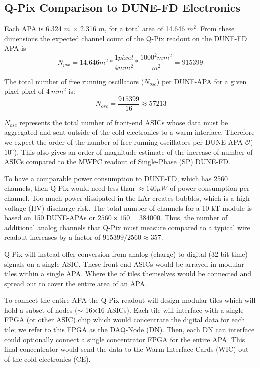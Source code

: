 \subsection{Q-Pix Comparison to DUNE-FD Electronics}
Each APA is 6.324 $\unit{m}$ $\times$ 2.316 $\unit{m}$, for a total area of 14.646 $\unit{m^{2}}$.
From these dimensions the expected channel count of the Q-Pix readout on the DUNE-FD APA is
\begin{equation}
  N_{pix} = 14.646 m^{2} * \frac{1 pixel}{4 mm^{2}} * \frac{ 1000^{2} mm^{2} }{m^{2}} = 915399
\end{equation}

The total number of free running oscillators ($N_{osc}$) per DUNE-APA for a given pixel pixel of $4~mm^{2}$ is:
\begin{equation}~\label{eq:nosc}
N_{osc} = \frac{915399}{16} \approx 57213
\end{equation}

$N_{osc}$ represents the total number of front-end ASICs whose data must be aggregated and sent outside of the cold electronics to a warm interface.
Therefore we expect the order of the number of free running oscillators per DUNE-APA $\mathcal{O}$($10^5$).
This also gives an order of magnitude estimate of the increase of number of ASICs compared to the MWPC readout of Single-Phase (SP) DUNE-FD.

To have a comparable power consumption to DUNE-FD, which has 2560 channels, then Q-Pix would need less than $\approx 140 \mu W$ of power consumption per channel.
Too much power dissipated in the LAr creates bubbles, which is a high voltage (HV) discharge risk.
The total number of channels for a 10 kT module is based on 150 DUNE-APAs or $2560\times 150 = $384000.
Thus, the number of additional analog channels that Q-Pix must measure compared to a typical wire readout increases by a factor of $915399 / 2560 \approx 357$.

Q-Pix will instead offer conversion from analog (charge) to digital (32 bit time) signals on a single ASIC.
These front-end ASICs would be arrayed in modular tiles within a single APA.
Where the of tiles themselves would be connected and spread out to cover the entire area of an APA.

To connect the entire APA the Q-Pix readout will design modular tiles which will hold a subset of nodes ($\sim$ 16$\times$16 ASICs).
Each tile will interface with a single FPGA (or other ASIC) chip which would concentrate the digital data for each tile; we refer to this FPGA as the DAQ-Node (DN).
Then, each DN can interface could optionally connect a single concentrator FPGA for the entire APA.
This final concentrator would send the data to the Warm-Interface-Cards (WIC) out of the cold electronics (CE).

